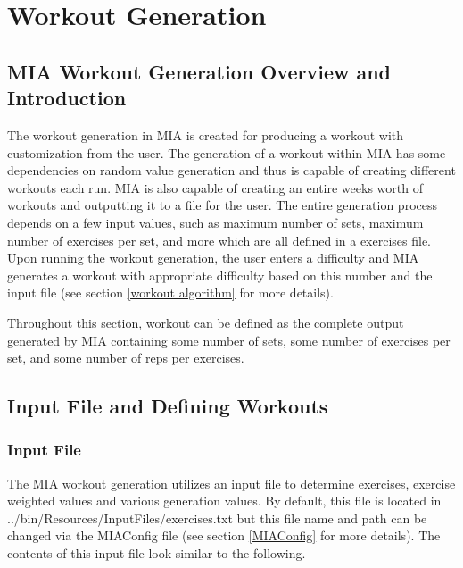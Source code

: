 \chapter{Workout Generation} \label{workout}
\pagestyle{fancy}

\section{MIA Workout Generation Overview and Introduction}

The workout generation in MIA is created for producing a workout with customization from the user. The generation of a workout within MIA has some dependencies on random value generation and thus is capable of creating different workouts each run. MIA is also capable of creating an entire weeks worth of workouts and outputting it to a file for the user. The entire generation process depends on a few input values, such as maximum number of sets, maximum number of exercises per set, and more which are all defined in a exercises file. Upon running the workout generation, the user enters a difficulty and MIA generates a workout with appropriate difficulty based on this number and the input file (see section \ref{workout algorithm} for more details).  

Throughout this section, workout can be defined as the complete output generated by MIA containing some number of sets, some number of exercises per set, and some number of reps per exercises.

\section{Input File and Defining Workouts}

\subsection{Input File}

The MIA workout generation utilizes an input file to determine exercises, exercise weighted values and various generation values. By default, this file is located in ../bin/Resources/InputFiles/exercises.txt but this file name and path can be changed via the MIAConfig file (see section \ref{MIAConfig} for more details). The contents of this input file look similar to the following.

\lstset{language=Python}

